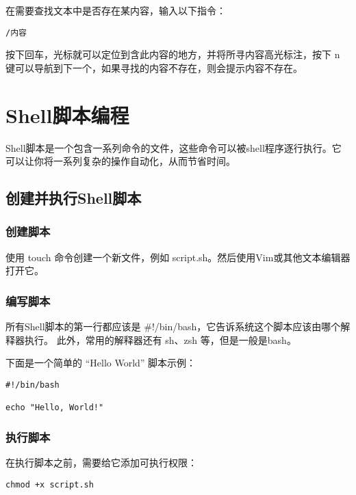 \documentclass[UTF8]{gyh}
\begin{document}
在需要查找文本中是否存在某内容，输入以下指令：

\begin{lstlisting}
/内容
\end{lstlisting}

按下回车，光标就可以定位到含此内容的地方，并将所寻内容高光标注，按下 n 键可以导航到下一个，如果寻找的内容不存在，则会提示内容不存在。


\section{Shell脚本编程}

Shell脚本是一个包含一系列命令的文件，这些命令可以被shell程序逐行执行。它可以让你将一系列复杂的操作自动化，从而节省时间。

\subsection{创建并执行Shell脚本}

\subsubsection{创建脚本}

使用 touch 命令创建一个新文件，例如 script.sh。然后使用Vim或其他文本编辑器打开它。

\subsubsection{编写脚本}

所有Shell脚本的第一行都应该是 #!/bin/bash，它告诉系统这个脚本应该由哪个解释器执行。 此外，常用的解释器还有 sh、zsh 等，但是一般是bash。

下面是一个简单的 “Hello World” 脚本示例：

\begin{lstlisting}
#!/bin/bash

echo "Hello, World!"
\end{lstlisting}

\subsubsection{执行脚本}

在执行脚本之前，需要给它添加可执行权限：

\begin{lstlisting}
chmod +x script.sh
\end{lstlisting}
\end{document}

